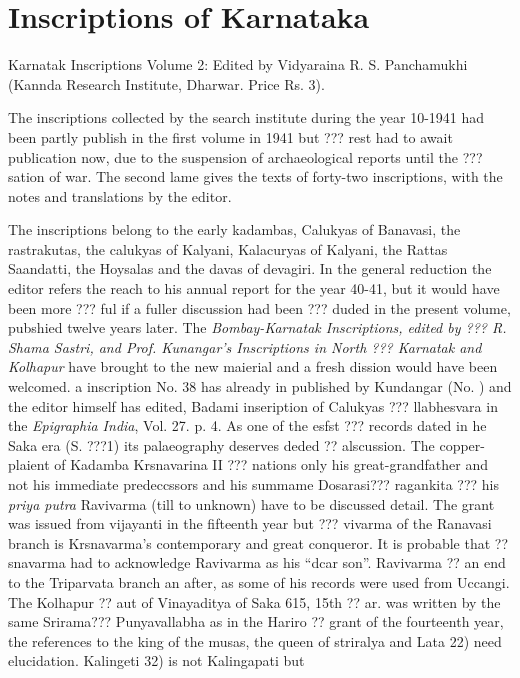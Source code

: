 \documentclass{book}
\begin{document}
\chapter*{Inscriptions of Karnataka}

Karnatak Inscriptions Volume 2: Edited by Vidyaraina R. S. Panchamukhi
(Kannda Research Institute, Dharwar. Price Rs. 3).

The inscriptions collected by the search institute during the year
10-1941 had been partly publish in the first volume in 1941 but ??? rest
had to await publication now, due  to the suspension of archaeological
reports until the ??? sation of war. The second lame gives the texts
of forty-two inscriptions, with the notes and translations by the
editor.

The inscriptions belong to the early kadambas, Calukyas of Banavasi,
the rastrakutas, the calukyas of Kalyani, Kalacuryas of Kalyani, the
Rattas Saandatti, the Hoysalas and the davas of devagiri. In the
general reduction the editor refers the reach to his annual report for
the year 40-41, but it would have been more ??? ful if a fuller
discussion had been ??? duded in the present volume, pubshied twelve
years later. The \textit{Bombay-Karnatak Inscriptions, edited by ???
R. Shama Sastri, and Prof. Kunangar's Inscriptions in North ??? Karnatak
and Kolhapur} have brought to the new maierial and a fresh dission
would have been welcomed. a inscription No. 38 has already in
published by Kundangar (No. ) and the editor himself has edited, Badami
inseription of Calukyas ??? llabhesvara in the \textit{Epigraphia
  India}, Vol. 27. p. 4. As one of the esfst ??? records dated in he
Saka era (S. ???1) its palaeography deserves deded ?? alscussion. The
copper-plaient of Kadamba Krsnavarina II ??? nations only his
great-grandfather and not his immediate predeccssors and his summame
Dosarasi??? ragankita ??? his \textit{priya putra} Ravivarma (till to
unknown) have to be discussed detail. The grant was issued from
vijayanti in the fifteenth year but ??? vivarma of the Ranavasi branch
is Krsnavarma's contemporary and great conqueror. It is probable that
?? snavarma had to acknowledge Ravivarma as his ``dcar
son''. Ravivarma ?? an end to the Triparvata branch an after, as some
of his records were used from Uccangi. The Kolhapur ?? aut of
Vinayaditya of Saka 615, 15th ?? ar. was written by the same
Srirama??? Punyavallabha as in the Hariro ?? grant of the fourteenth
year, the references to the king of the musas, the queen of striralya
and Lata 22) need elucidation. Kalingeti 32) is not Kalingapati but
\end{document}
